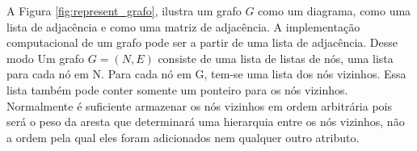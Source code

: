 \FloatBarrier

A Figura \ref{fig:represent_grafo}, ilustra um grafo $G$ como um diagrama, como uma lista de adjacência e como uma matriz de adjacência. A implementação computacional de um grafo pode ser a partir de uma lista de adjacência. Desse modo Um grafo $G = (N, E)$ consiste de uma lista de listas de nós, uma lista para cada nó em N. Para cada nó em G, tem-se uma lista dos nós vizinhos. Essa lista também pode conter somente um ponteiro para os nós vizinhos. Normalmente é suficiente armazenar os nós vizinhos em ordem arbitrária pois será o peso da aresta que determinará uma hierarquia entre os nós vizinhos, não a ordem pela qual eles foram adicionados nem qualquer outro atributo.
